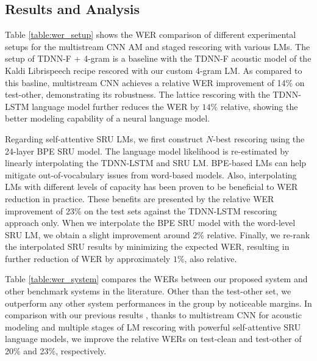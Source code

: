 \documentclass[a4paper]{article}
\begin{document}
\subsection{Results and Analysis}
Table \ref{table:wer_setup} shows the WER comparison of different experimental setups for the multistream CNN AM and staged rescoring with various LMs. The setup of TDNN-F + 4-gram is a baseline with the TDNN-F acoustic model of the Kaldi Librispeech recipe rescored with our custom 4-gram LM. As compared to this basline, multistream CNN achieves a relative WER improvement of 14\% on test-other, demonstrating its robustness. The lattice rescoring with the TDNN-LSTM language model further reduces the WER by $14\%$ relative, showing the better modeling capability of a neural language model.

Regarding self-attentive SRU LMs, we first construct $N$-best rescoring using the 24-layer BPE SRU model. The language model likelihood is re-estimated by linearly interpolating the TDNN-LSTM and SRU LM. BPE-based LMs can help mitigate out-of-vocabulary issues from word-based models. Also, interpolating LMs with different levels of capacity has been proven to be beneficial to WER reduction in practice. These benefits are presented by the relative WER improvement of 23\% on the test sets against the TDNN-LSTM rescoring approach only. When we interpolate the BPE SRU model with the word-level SRU LM, we obtain a slight improvement around $2\%$ relative. Finally, we re-rank the interpolated SRU results by minimizing the expected WER, resulting in further reduction of WER by approximately $1\%$, also relative.



Table \ref{table:wer_system} compares the WERs between our proposed system and other benchmark systems in the literature. Other than the test-other set, we outperform any other system performances in the group by noticeable margins. In comparison with our previous results \cite{han19-2}, thanks to multistream CNN for acoustic modeling and multiple stages of LM rescoring with powerful self-attentive SRU language models, we improve the relative WERs on test-clean and test-other of 20\% and 23\%, respectively.
\end{document}
